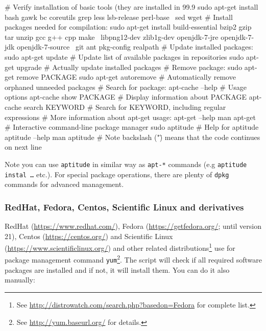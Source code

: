 \documentclass[a4paper, 11pt, twoside]{article}
\begin{document}
\begin{bashcode}
  # Verify installation of basic tools (they are installed in 99.9%
  sudo apt-get install bash gawk bc coreutils grep less lsb-release perl-base \
    sed wget
  # Install packages needed for compilation:
  sudo apt-get install build-essential bzip2 gzip tar unzip gcc g++ cpp make \
    libpng12-dev zlib1g-dev openjdk-7-jre openjdk-7-jdk openjdk-7-source \
    git ant pkg-config realpath
  # Update installed packages:
  sudo apt-get update # Update list of available packages in repositories
  sudo apt-get upgrade # Actually update installed packages
  # Remove package:
  sudo apt-get remove PACKAGE
  sudo apt-get autoremove # Automatically remove orphaned unneeded packages
  # Search for package:
  apt-cache --help # Usage options
  apt-cache show PACKAGE # Display information about PACKAGE
  apt-cache search KEYWORD # Search for KEYWORD, including regular expressions
  # More information about apt-get usage:
  apt-get --help
  man apt-get
  # Interactive command-line package manager
  sudo aptitude
  # Help for aptitude
  aptitude --help
  man aptitude
  # Note backslash ("\") means that the code continues on next line
\end{bashcode}

Note you can use \texttt{aptitude} in similar way as \texttt{apt-*} commands (e.g \texttt{aptitude instal \ldots} etc.). For special package operations, there are plenty of \texttt{dpkg} commands for advanced management.

\subsubsection{RedHat, Fedora, Centos, Scientific Linux and derivatives}

RedHat (\href{https://www.redhat.com/}{https://www.redhat.com/}), Fedora (\href{https://getfedora.org/}{https://getfedora.org/}; until version 21), Centos (\href{https://centos.org/}{https://centos.org/}) and Scientific Linux (\href{https://www.scientificlinux.org/}{https://www.scientificlinux.org/}) and other related distributions\footnote{See \href{http://distrowatch.com/search.php?basedon=Fedora}{http://distrowatch.com/search.php?basedon=Fedora} for complete list.} use for package management command \texttt{yum}\footnote{See \href{http://yum.baseurl.org/}{http://yum.baseurl.org/} for details.}. The script will check if all required software packages are installed and if not, it will install them. You can do it also manually:
\end{document}

